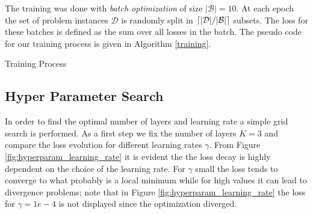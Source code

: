 \documentclass{rescience} %
\begin{document}
The training was done with \textit{batch optimization} of size $|\mathcal{B}|=10$.
At each epoch the set of problem instances $\mathcal{D}$ is randomly split in $\lceil |\mathcal{D}|/|\mathcal{B}| \rceil$ subsets.
The loss for these batches is defined as the sum over all losses in the batch. The pseudo code for our training process is given in Algorithm \ref{training}.

\begin{algorithm}[h]
    \Data{$\underline{\mG}$,$\underline{\vb}$,$\underline{\vf}$}
    \BlankLine
 \label{training}
 \caption{Training Process}
\end{algorithm}

\subsection{Hyper Parameter Search}
In order to find the optimal number of layers and learning rate a simple grid search is performed.
As a first step we fix the number of layers $K=3$ and compare the loss evolution for different learning rates $\gamma$.
From Figure \ref{fig:hyperparam_learning_rate} it is evident the the loss decay is highly dependent on the choice of the learning rate. For $\gamma$ small the loss tends to converge to what probably is a local minimum while for high values it can lead to divergence problems; note that in Figure \ref{fig:hyperparam_learning_rate} the loss for $\gamma=1e-4$ is not displayed since the optimization diverged. 
\end{document}

